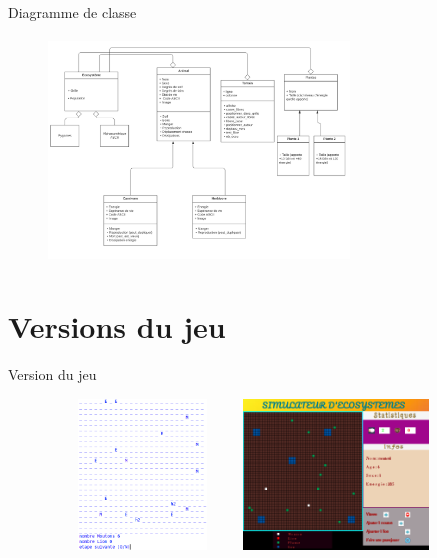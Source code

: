 \documentclass{beamer}
\begin{document}
\begin{frame}{Diagramme de classe}
    \begin{figure}
        \centering
        \includegraphics[width=8cm, height=6cm]{images/diagramme.png}
    \end{figure}
\end{frame}



\section{Versions du jeu}

\begin{frame}{Version du jeu}

\begin{figure}[h]
    \begin{minipage}[c]{.46\linewidth}
        \centering
        \includegraphics[width=5cm, height=4cm]{images/console.png}
    \end{minipage}
    \hfill%
    \begin{minipage}[c]{.46\linewidth}
        \centering
        \includegraphics[width=5cm, height=4cm]{images/interface.png}
    \end{minipage}
\end{figure}
    
\end{frame}
\end{document}

